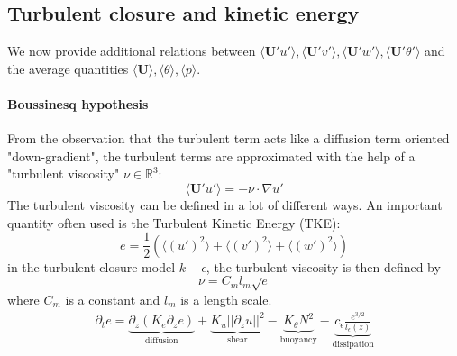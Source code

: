 \subsection{Turbulent closure and kinetic energy}
\label{sec:airseaSCM_turbulentClosure}
We now provide additional relations between
$\langle \mathbf{U}' u'\rangle, \langle \mathbf{U}' v'\rangle,\langle \mathbf{U}' w'\rangle,
\langle \mathbf{U}' \theta'\rangle$ and the average quantities
$\langle \mathbf{U}\rangle, \langle \theta \rangle, \langle p \rangle$.
\paragraph{Boussinesq hypothesis}
From the observation that the turbulent term acts like a diffusion
term oriented "down-gradient", the turbulent terms are approximated
with the help of a "turbulent viscosity" $\nu \in \mathbb{R}^3$:
\begin{equation}
\langle \mathbf{U}' u'\rangle = - \nu \cdot \nabla u'
\end{equation}
The turbulent viscosity can be defined in a lot of different ways.
An important quantity often used is the Turbulent Kinetic Energy (TKE):
\begin{equation}
	e = \frac{1}{2} \left(\langle (u')^2 \rangle + \langle (v')^2 \rangle
	+ \langle (w')^2 \rangle\right)
\end{equation}
in the turbulent closure model $k-\epsilon$,
the turbulent viscosity is then defined by
\begin{equation}
	\nu = C_m l_m \sqrt{e}
\end{equation}
where $C_m$ is a constant and $l_m$ is a length scale.
\begin{equation}
\label{eq:airseaSCM_TKE_evolution}
    \begin{aligned}
    \partial_t e =
    \underbrace{\partial_z \left(K_e
    \partial_z e\right)}_{\text{diffusion}}
    + \underbrace{K_u ||\partial_z u||^2}_{\text{shear}} 
    - \underbrace{K_{\theta} N^2 }_{\text{buoyancy}}
    - \underbrace{c_{\epsilon}
    \frac{e^{3/2}}{l_{\epsilon}(z)}}_{\text{dissipation}}
    \end{aligned}
\end{equation}
